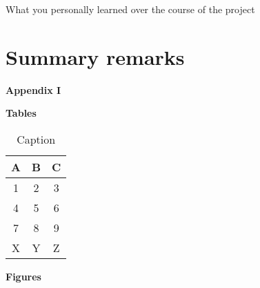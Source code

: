 \documentclass[11pt,a4paper]{article}
\begin{document}
What you personally learned over the course of the project

\newpage

\section{Summary remarks} \label{summary-remarks}

%
%

\newpage

\noindent\Large{\textbf{Appendix I}} \label{appendix-i}

\newpage

\noindent\textbf{\Large{Tables}}

\begin{table}[h!]
    \centering
    \caption{Caption}
    \label{tab-label}
    \begin{tabular}{|c|c|c|}
        \hline
        A&
        B&
        C\\
        \hline
        1&2&3\\
        \hline
        4&5&6\\
        \hline
        7&8&9\\
        \hline
        X&Y&Z\\
        \hline
    \end{tabular}
\end{table}

\newpage

\noindent\textbf{\Large{Figures}}

\end{document}
